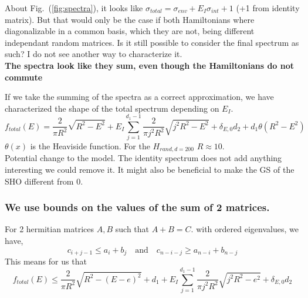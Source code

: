 \documentclass{article}
\begin{document}
About Fig.~(\ref{fig:spectra}), it looks like $\sigma_{total}=\sigma_{env}+E_I\sigma_{int} + 1$ (+1 from identity matrix). But that would only be the case if both Hamiltonians where diagonalizable in a common basis, which they are not, being different independant random matrices. Is it still possible to consider the final spectrum as such? I do not see another way to characterize it.\\

{\color{teal} \textbf{The spectra look like they sum, even though the Hamiltonians do not commute}}

If we take the summing of the spectra as a correct approximation, we have characterized the shape of the total spectrum depending on $E_I$. 
\begin{equation}
    f_{total}(E) = \frac{2}{\pi R^2}\sqrt{R^2-E^2} + E_I\sum_{j=1}^{d_1-1}\frac{2}{\pi j^2R^2}\sqrt{j^2R^2-E^2} + \delta_{E,0}d_2 + d_1\theta(R^2-E^2)
\end{equation}
$\theta(x)$ is the Heaviside function. For the $H_{rand, d=200}$ $R\approx 10$.\\

Potential change to the model. The identity spectrum does not add anything interesting we could remove it. It might also be beneficial to make the GS of the SHO different from 0. 

\subsubsection{We use bounds on the values of the sum of 2 matrices.}

For 2 hermitian matrices $A,B$ such that $A+B=C$. with ordered eigenvalues, we have,
\begin{equation}
    c_{i+j-1}\leq a_i+b_j\quad\text{and}\quad c_{n-i-j}\geq a_{n-i}+b_{n-j}
\end{equation}
This means for us that
\begin{equation}
    f_{total}(E)\leq \frac{2}{\pi R^2}\sqrt{R^2-(E-e)^2} + d_1 + E_I\sum^{d_1-1}_{j=1}\frac{2}{\pi j^2 R^2}\sqrt{j^2R^2-e^2} +\delta_{E,0}d_2
\end{equation}
\end{document}
